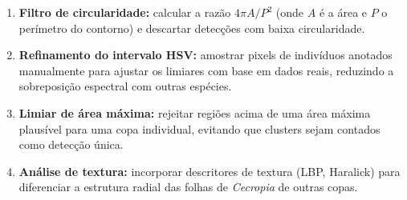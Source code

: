 \documentclass[12pt, a4paper]{article}
\begin{document}
\begin{enumerate}
    \item \textbf{Filtro de circularidade:} calcular a razão
    $4\pi A / P^2$ (onde $A$ é a área e $P$ o perímetro do contorno) e descartar
    detecções com baixa circularidade.
    \item \textbf{Refinamento do intervalo HSV:} amostrar pixels de indivíduos
    anotados manualmente para ajustar os limiares com base em dados reais,
    reduzindo a sobreposição espectral com outras espécies.
    \item \textbf{Limiar de área máxima:} rejeitar regiões acima de uma área
    máxima plausível para uma copa individual, evitando que clusters sejam
    contados como detecção única.
    \item \textbf{Análise de textura:} incorporar descritores de textura (LBP,
    Haralick) para diferenciar a estrutura radial das folhas de \textit{Cecropia}
    de outras copas.
\end{enumerate}
\end{document}

